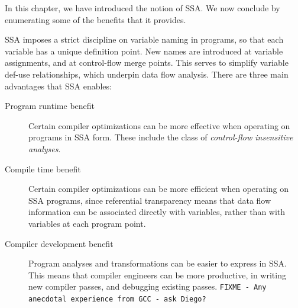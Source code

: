 In this chapter, we have introduced the notion of SSA.
We now conclude by enumerating some of the benefits 
that it provides.

SSA imposes a strict discipline on variable naming in programs,
so that each variable has a unique definition point.
New names are introduced at variable assignments, and at control-flow
merge points.
This serves to simplify variable def-use relationships,
which underpin data flow analysis.
There are three main advantages that SSA enables:
\begin{description}
\item[Program runtime benefit]
Certain compiler optimizations can be more effective
when operating on programs in SSA form. These include the
class of \textit{control-flow insensitive analyses}.
\item[Compile time benefit]
Certain compiler optimizations can be more efficient
when operating on SSA programs, since
referential transparency means that data flow information
can be associated directly with variables, rather than with variables
at each program point.
\item[Compiler development benefit]
Program analyses and transformations can be easier
to express in SSA. This means that compiler engineers
can be more productive, in writing new compiler passes,
and debugging existing passes.
\texttt{FIXME - Any anecdotal experience from GCC - ask Diego?}
\end{description}



